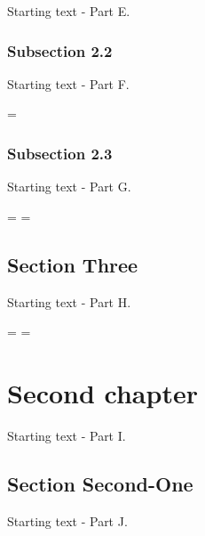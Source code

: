 \documentclass[12pt,twoside]{book}%
\begin{document}
Starting text - Part E.

%
{
\raggedleft%
\subsection{Subsection 2.2}%

Starting text - Part F.

%
\font=\originwordstretch%
\font=8pt%

}
%
\subsection{Subsection 2.3}%

Starting text - Part G.

%
\font=\originwordstretch%
\font=10pt%
\font=\originwordstretch%
\font=12pt%
\section{Section Three}%

Starting text - Part H.

%
{}\font=\originwordstretch%
\font=\originwordspace%

%
\chapter{Second chapter}%

Starting text - Part I.

%
\section{Section Second-One}%

Starting text - Part J.

%
\end{document}
